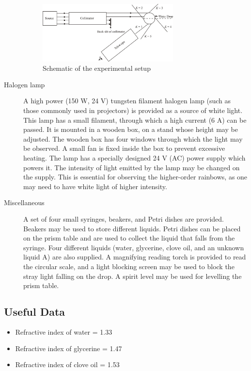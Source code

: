 \begin{description}
    \begin{figure}[!htb]
        \centering
        \includegraphics[width=0.70\textwidth]{figs/img2.jpg}
        \caption{Schematic of the experimental setup}
        \label{fig:experimentalsetup}
    \end{figure}

    \item[Halogen lamp]

    A high power (150 W, 24 V) tungsten filament halogen lamp (such as those commonly used in projectors) is provided as a source of white light. This lamp has a small filament, through which a high current (6 A) can be passed. It is mounted in a wooden box, on a stand whose height may be adjusted. The wooden box has four windows through which the light may be observed. A small fan is fixed inside the box to prevent excessive heating. The lamp has a specially designed 24 V (AC) power supply which powers it. The intensity of light emitted by the lamp may be changed on the supply. This is essential for observing the higher-order rainbows, as one may need to have white light of higher intensity.

    \item[Miscellaneous]
    A set of four small syringes, beakers, and Petri dishes are provided. Beakers may be used to store different liquids. Petri dishes can be placed on the prism table and are used to collect the liquid that falls from the syringe. Four different liquids (water, glycerine, clove oil, and an unknown liquid A) are also supplied. A magnifying reading torch is provided to read the circular scale, and a light blocking screen may be used to block the stray light falling on the drop. A spirit level may be used for levelling the prism table.

\end{description}


\subsection*{Useful Data}
\begin{itemize}
    \item Refractive index of water = 1.33
    \item Refractive index of glycerine = 1.47
    \item Refractive index of clove oil = 1.53
\end{itemize}

